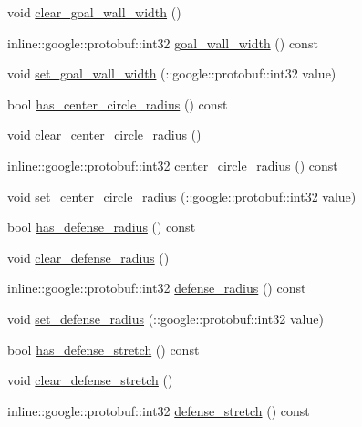 \begin{DoxyCompactItemize}
void \hyperlink{class_s_s_l___geometry_field_size_ab20ed73fce625ca1d22ea1be165e3324}{clear\-\_\-goal\-\_\-wall\-\_\-width} ()
\item 
inline\-::google\-::protobuf\-::int32 \hyperlink{class_s_s_l___geometry_field_size_a79f90924c78f622a79d9cf147f30f6a9}{goal\-\_\-wall\-\_\-width} () const 
\item 
void \hyperlink{class_s_s_l___geometry_field_size_a582119b58c44dfc5f7ccbde9fa6e8357}{set\-\_\-goal\-\_\-wall\-\_\-width} (\-::google\-::protobuf\-::int32 value)
\item 
bool \hyperlink{class_s_s_l___geometry_field_size_ac109809e4432e2959a517cc812752546}{has\-\_\-center\-\_\-circle\-\_\-radius} () const 
\item 
void \hyperlink{class_s_s_l___geometry_field_size_a7492fcbdb13abe16d3286c692807fcc1}{clear\-\_\-center\-\_\-circle\-\_\-radius} ()
\item 
inline\-::google\-::protobuf\-::int32 \hyperlink{class_s_s_l___geometry_field_size_a8d35a0e5181336249282b9781676ac87}{center\-\_\-circle\-\_\-radius} () const 
\item 
void \hyperlink{class_s_s_l___geometry_field_size_a05d53c67355dcb8e065fff1b27e5db18}{set\-\_\-center\-\_\-circle\-\_\-radius} (\-::google\-::protobuf\-::int32 value)
\item 
bool \hyperlink{class_s_s_l___geometry_field_size_a1be07545d160329e897f0a93eade637c}{has\-\_\-defense\-\_\-radius} () const 
\item 
void \hyperlink{class_s_s_l___geometry_field_size_a9df2790aeccd93820b5b240954623f70}{clear\-\_\-defense\-\_\-radius} ()
\item 
inline\-::google\-::protobuf\-::int32 \hyperlink{class_s_s_l___geometry_field_size_ae2540126043dc504a85324ab54baaa93}{defense\-\_\-radius} () const 
\item 
void \hyperlink{class_s_s_l___geometry_field_size_a096237a1aa241bed3bd46fb9bb575f2e}{set\-\_\-defense\-\_\-radius} (\-::google\-::protobuf\-::int32 value)
\item 
bool \hyperlink{class_s_s_l___geometry_field_size_a5b9d6fd0494df52dc704663ed3cacefe}{has\-\_\-defense\-\_\-stretch} () const 
\item 
void \hyperlink{class_s_s_l___geometry_field_size_a8fe237fd6e9850a03087dd302f2e895b}{clear\-\_\-defense\-\_\-stretch} ()
\item 
inline\-::google\-::protobuf\-::int32 \hyperlink{class_s_s_l___geometry_field_size_a2958df54ae78b8c4aba805dd447b465b}{defense\-\_\-stretch} () const 
\item 

\end{DoxyCompactItemize}
